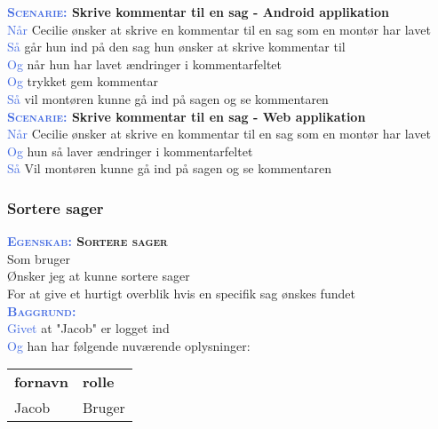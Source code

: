 \textbf{\textsc{\textcolor{RoyalBlue}{Scenarie:}} Skrive kommentar til en sag - Android applikation}\\
\textcolor{RoyalBlue}{Når} Cecilie ønsker at skrive en kommentar til en sag som en montør har lavet\\
\textcolor{RoyalBlue}{Så} går hun ind på den sag hun ønsker at skrive kommentar til \\
\textcolor{RoyalBlue}{Og} når hun har lavet ændringer i kommentarfeltet\\
\textcolor{RoyalBlue}{Og} trykket gem kommentar\\
\textcolor{RoyalBlue}{Så} vil montøren kunne gå ind på sagen og se kommentaren\\

\textbf{\textsc{\textcolor{RoyalBlue}{Scenarie:}} Skrive kommentar til en sag - Web applikation}\\
\textcolor{RoyalBlue}{Når} Cecilie ønsker at skrive en kommentar til en sag som en montør har lavet\\
\textcolor{RoyalBlue}{Og} hun så laver ændringer i kommentarfeltet\\
\textcolor{RoyalBlue}{Så} Vil montøren kunne gå ind på sagen og se kommentaren\\


\subsubsection{Sortere sager}
\textbf{\textsc{\textcolor{RoyalBlue}{Egenskab:} Sortere sager}}\\
Som bruger\\
Ønsker jeg at kunne sortere sager\\
For at give et hurtigt overblik hvis en specifik sag ønskes fundet\\

\textsc{\textcolor{RoyalBlue}{\textbf{Baggrund:}}}\\
\textcolor{RoyalBlue}{Givet} at "Jacob" er logget ind\\
\textcolor{RoyalBlue}{Og} han har følgende nuværende oplysninger:\\
\begin{tabular}{| l | l |}
	\textbf{fornavn} & \textbf{rolle} \\
	Jacob & Bruger\\
\end{tabular}
\newline \newline

